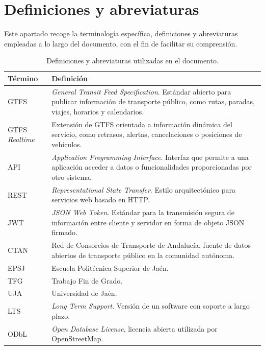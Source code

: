 \chapter{Definiciones y abreviaturas}
\label{cap:definiciones}

Este apartado recoge la terminología específica, definiciones y abreviaturas empleadas a lo largo del documento, con el fin de facilitar su comprensión.

\begin{table}[h!]
\centering
\small
\begin{tabular}{|p{3.5cm}|p{11cm}|}
\hline
\textbf{Término} & \textbf{Definición} \\ \hline
GTFS & \textit{General Transit Feed Specification}. Estándar abierto para publicar información de transporte público, como rutas, paradas, viajes, horarios y calendarios. \\ \hline
GTFS \textit{Realtime} & Extensión de GTFS orientada a información dinámica del servicio, como retrasos, alertas, cancelaciones o posiciones de vehículos. \\ \hline
API & \textit{Application Programming Interface}. Interfaz que permite a una aplicación acceder a datos o funcionalidades proporcionadas por otro sistema. \\ \hline
REST & \textit{Representational State Transfer}. Estilo arquitectónico para servicios web basado en HTTP. \\ \hline
JWT & \textit{JSON Web Token}. Estándar para la transmisión segura de información entre cliente y servidor en forma de objeto JSON firmado. \\ \hline
CTAN & Red de Consorcios de Transporte de Andalucía, fuente de datos abiertos de transporte público en la comunidad autónoma. \\ \hline
EPSJ & Escuela Politécnica Superior de Jaén. \\ \hline
TFG & Trabajo Fin de Grado. \\ \hline
UJA & Universidad de Jaén. \\ \hline
LTS & \textit{Long Term Support}. Versión de un software con soporte a largo plazo. \\ \hline
ODbL & \textit{Open Database License}, licencia abierta utilizada por OpenStreetMap. \\ \hline
\end{tabular}
\caption{Definiciones y abreviaturas utilizadas en el documento.}
\label{tab:definiciones}
\end{table}
